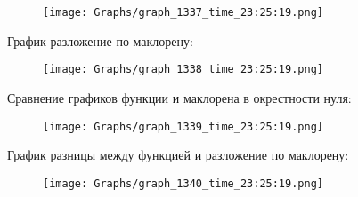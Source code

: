 \begin{figure}[H]
\centering
\texttt{[image: Graphs/graph\_1337\_time\_23:25:19.png]}
\end{figure}
График разложение по маклорену:

\begin{figure}[H]
\centering
\texttt{[image: Graphs/graph\_1338\_time\_23:25:19.png]}
\end{figure}
Сравнение графиков функции и маклорена в окрестности нуля:

\begin{figure}[H]
\centering
\texttt{[image: Graphs/graph\_1339\_time\_23:25:19.png]}
\end{figure}
График разницы между функцией и разложение по маклорену:

\begin{figure}[H]
\centering
\texttt{[image: Graphs/graph\_1340\_time\_23:25:19.png]}
\end{figure}
